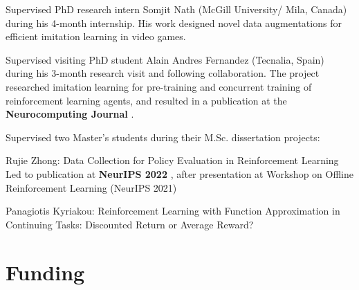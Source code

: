 \documentclass[a4paper,12pt]{article}
\begin{document}
\begin{expblock}
    Supervised PhD research intern Somjit Nath (McGill University/ Mila, Canada) during his 4-month internship. His work designed novel data augmentations for efficient imitation learning in video games.%
\end{expblock}

\begin{expblock}
    Supervised visiting PhD student Alain Andres Fernandez (Tecnalia, Spain) during his 3-month research visit and following collaboration. The project researched imitation learning for pre-training and concurrent training of reinforcement learning agents, and resulted in a publication at the \textbf{Neurocomputing Journal} \cite{andres2024using}.
\end{expblock}

\begin{expblock}
    Supervised two Master's students during their M.Sc. dissertation projects:
    \begin{explist}
	\item Rujie Zhong: Data Collection for Policy Evaluation in Reinforcement Learning\\
	Led to publication at \textbf{NeurIPS 2022} \cite{zhong2022datacollection}, after presentation at Workshop on Offline Reinforcement Learning (NeurIPS 2021)
	\item Panagiotis Kyriakou: Reinforcement Learning with Function Approximation in Continuing Tasks: Discounted Return or Average Reward?
    \end{explist}
\end{expblock}

\section{Funding}
\end{document}
